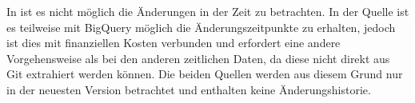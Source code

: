 In  ist es nicht möglich die Änderungen in der Zeit zu betrachten.
In der  Quelle ist es teilweise mit BigQuery möglich die Änderungszeitpunkte zu erhalten, jedoch ist dies mit finanziellen Kosten verbunden und erfordert eine andere Vorgehensweise als bei den anderen zeitlichen Daten, da diese nicht direkt aus Git extrahiert werden können.
Die beiden Quellen werden aus diesem Grund nur in der neuesten Version betrachtet und enthalten keine Änderungshistorie.







